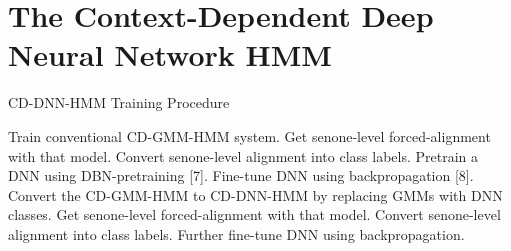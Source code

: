 \documentclass{article}
\begin{document}
\section{The Context-Dependent Deep
Neural Network HMM}
\begin{algorithm}[tb]
   \caption{CD-DNN-HMM Training Procedure}
   \label{alg:example}
\begin{algorithmic}
   Train conventional CD-GMM-HMM system.
Get senone-level forced-alignment with that model.
Convert senone-level alignment into class labels.
Pretrain a DNN using DBN-pretraining [7].
Fine-tune DNN using backpropagation [8].
Convert the CD-GMM-HMM to CD-DNN-HMM by replacing GMMs with DNN classes.
Get senone-level forced-alignment with that model.
Convert senone-level alignment into class labels.
Further fine-tune DNN using backpropagation.
\end{algorithmic}
\end{algorithm}
\end{document}
